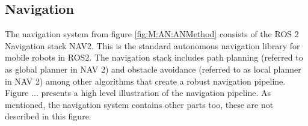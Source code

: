 


\subsection{Navigation} \label{sec:M:AN:Navigation}
The navigation system from figure \ref{fig:M:AN:ANMethod} consists of the ROS 2 Navigation stack NAV2. This is the standard autonomous navigation library for mobile robots in ROS2. The navigation stack includes path planning (referred to as global planner in NAV 2) and obstacle avoidance (referred to as local planner in NAV 2) among other algorithms that create a robust navigation pipeline. Figure ... presents a high level illustration of the navigation pipeline. As mentioned, the navigation system contains other parts too, these are not described in this figure.

